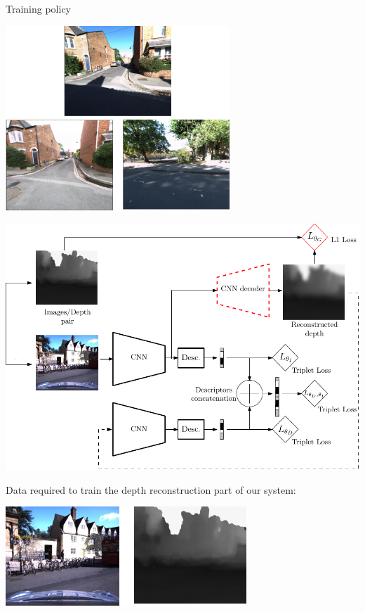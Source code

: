 \begin{frame}{Training policy}
{\begin{minipage}{0.3\linewidth}
		\includegraphics[width=\linewidth]{vect/method/fig3/triplet}	
	\end{minipage}		
	}
	{
	\begin{minipage}{0.6\linewidth}
		\centering
		\includegraphics[width=\linewidth]{vect/method/fig3/6d}	
	\end{minipage}\hfill
	\begin{minipage}{0.3\linewidth}
		\raggedright
		Data required to train the depth reconstruction part of our system:
		\vspace{0.5cm}
		
		\includegraphics[width=\linewidth]{vect/method/fig3/pair}	
	\end{minipage}			
	}
\end{frame}


